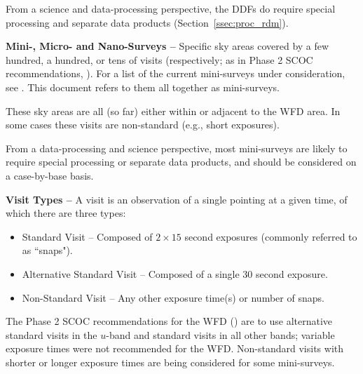 From a science and data-processing perspective, the DDFs do require 
special processing and separate data products (Section~\ref{ssec:proc_rdm}).


\textbf{Mini-, Micro- and Nano-Surveys -- }
Specific sky areas covered by a few hundred, a hundred, or tens of visits 
(respectively; as in Phase 2 SCOC recommendations, ).
For a list of the current mini-surveys under consideration, see 
.
This document refers to them all together as mini-surveys.

These sky areas are all (so far) either within or adjacent to the WFD area.
In some cases these visits are non-standard (e.g., short exposures).

From a data-processing and science perspective, most mini-surveys are 
likely to require special processing or separate data products, and should 
be considered on a case-by-base basis.


\textbf{Visit Types -- }
A visit is an observation of a single pointing at a given time, of which 
there are three types:

\begin{itemize}
\item Standard Visit -- Composed of $2\times15$ second exposures (commonly referred to as ``snaps").
\item Alternative Standard Visit -- Composed of a single $30$ second exposure.
\item Non-Standard Visit -- Any other exposure time(s) or number of snaps.
\end{itemize}

The Phase 2 SCOC recommendations for the WFD () are to 
use alternative standard visits in the $u$-band and standard visits in all 
other bands; variable exposure times were not recommended for the WFD. 
Non-standard visits with shorter or longer exposure times are being 
considered for some mini-surveys.

